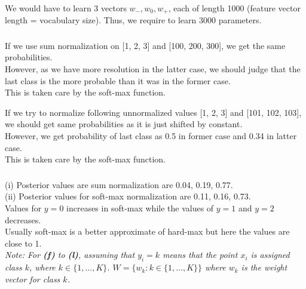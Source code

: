 \documentclass[12pt, fleqn]{article}
\begin{document}
\subsubsection{}
We would have to learn 3 vectors $w_-, w_0, w_+$, each of length 1000 (feature vector length = vocabulary size). Thus, we require to learn 3000 parameters.

\subsubsection{}
If we use sum normalization on [1, 2, 3] and [100, 200, 300], we get the same probabilities. \\
However, as we have more resolution in the latter case, we should judge that the last class is the more probable than it was in the former case. \\
This is taken care by the soft-max function.

If we try to normalize following unnormalized values [1, 2, 3] and [101, 102, 103], we should get same probabilities as it is just shifted by constant. \\
However, we get probability of last class as 0.5 in former case and 0.34 in latter case. \\
This is taken care by the soft-max function.

\subsubsection{}
(i) Posterior values are sum normalization are 0.04, 0.19, 0.77. \\
(ii) Posterior values for soft-max normalization are 0.11, 0.16, 0.73. \\
Values for $y=0$ increases in soft-max while the values of $y=1$ and $y=2$ decreases. \\
Usually soft-max is a better approximate of hard-max but here the values are close to 1. \\

\medskip
\textit{Note: For \textbf{(f)} to \textbf{(l)}, assuming that $y_i = k$ means that the point $x_i$ is assigned class $k$, where $k \in \{1, \dots, K\}$. $W = \{w_k : k \in \{1, \dots, K\}  \}$ where $w_k$ is the weight vector for class $k$.}
\end{document}
